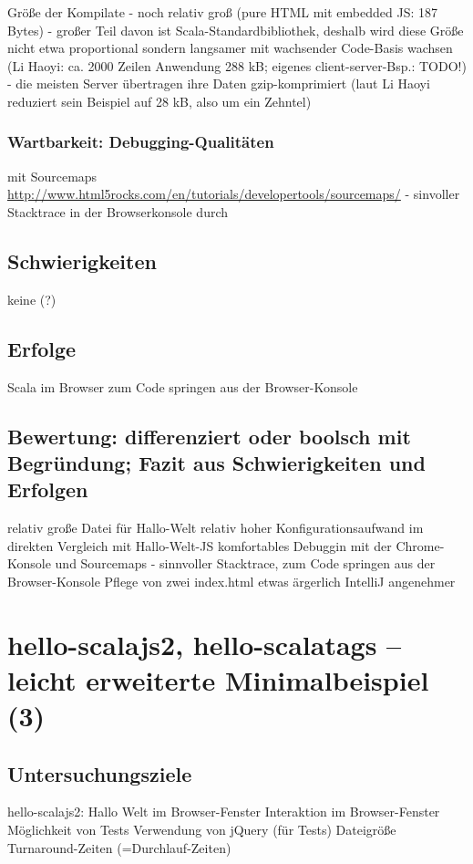 \documentclass[a4paper, 12pt, listof=totoc, bibliography=totoc]{scrreprt}
\begin{document}
Größe der Kompilate
- noch relativ groß (pure HTML mit embedded JS: 187 Bytes)
- großer Teil davon ist Scala-Standardbibliothek, deshalb wird diese Größe nicht etwa proportional sondern langsamer mit wachsender Code-Basis wachsen (Li Haoyi: ca. 2000 Zeilen Anwendung 288 kB; eigenes client-server-Bsp.: TODO!)
- die meisten Server übertragen ihre Daten gzip-komprimiert (laut Li Haoyi reduziert sein Beispiel auf 28 kB, also um ein Zehntel)
\cite{haoyi.HOS}



\subsubsection{Wartbarkeit: Debugging-Qualitäten}

mit Sourcemaps
\url{http://www.html5rocks.com/en/tutorials/developertools/sourcemaps/}
	- sinvoller Stacktrace in der Browserkonsole durch


\subsection{Schwierigkeiten}
keine (?)
\subsection{Erfolge}
Scala im Browser
zum Code springen aus der Browser-Konsole
\subsection{Bewertung: differenziert oder boolsch mit Begründung; Fazit aus Schwierigkeiten und Erfolgen}
relativ große Datei für Hallo-Welt
relativ hoher Konfigurationsaufwand im direkten Vergleich mit Hallo-Welt-JS
komfortables Debuggin mit der Chrome-Konsole und Sourcemaps - sinnvoller Stacktrace, zum Code springen aus der Browser-Konsole
Pflege von zwei index.html etwas ärgerlich
IntelliJ angenehmer



\section{hello-scalajs2, hello-scalatags -- leicht erweiterte Minimalbeispiel (3)}

\subsection{Untersuchungsziele}
hello-scalajs2:
Hallo Welt im Browser-Fenster
Interaktion im Browser-Fenster
Möglichkeit von Tests
Verwendung von jQuery (für Tests)
Dateigröße
Turnaround-Zeiten (=Durchlauf-Zeiten)
\end{document}
